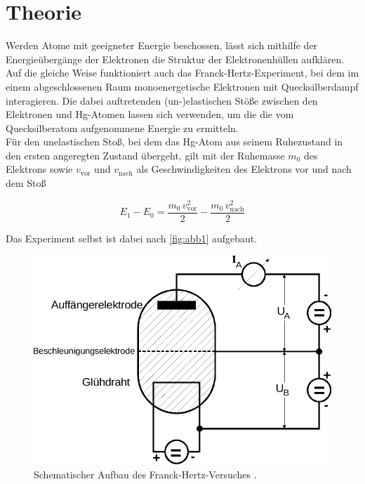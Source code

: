 \section{Theorie}
\label{sec:theorie}

Werden Atome mit geeigneter Energie beschossen, lässt sich mithilfe
der Energieübergänge der Elektronen die Struktur der Elektronenhüllen aufklären. \\

Auf die gleiche Weise funktioniert auch das Franck-Hertz-Experiment,
bei dem im einem abgeschlossenen Raum monoenergetische Elektronen mit
Quecksilberdampf interagieren.
Die dabei auftretenden (un-)elastischen Stöße zwischen den Elektronen und Hg-Atomen
lassen sich verwenden, um die die vom Quecksilberatom aufgenommene Energie zu ermitteln. \\

Für den unelastischen Stoß, bei dem das Hg-Atom aus seinem Ruhezustand in den
ersten angeregten Zustand übergeht, gilt mit der Ruhemasse $m_0$
des Elektrons sowie $v_\text{vor}$ und $v_\text{nach}$ als Geschwindigkeiten
des Elektrons vor und nach dem Stoß

\begin{equation*}
    E_1 - E_0 = \dfrac{m_0 \, v^2_\text{vor}}{2} -\dfrac{m_0 \, v^2_\text{nach}}{2}
\end{equation*}

Das Experiment selbst ist dabei nach \autoref{fig:abb1} aufgebaut.

\begin{figure}[H]
    \centering
    \includegraphics{figures/Abb_1.pdf}
    \caption{Schematischer Aufbau des Franck-Hertz-Versuches \cite{ap08}.}
    \label{fig:abb1}
\end{figure}

